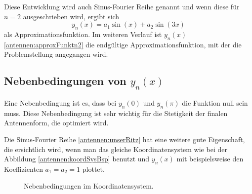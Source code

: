 Diese Entwicklung wird auch Sinus-Fourier Reihe genannt
und wenn diese für $n=2$ ausgeschrieben wird, ergibt sich
\begin{equation}
	y_n(x)
	=
	a_1\sin(x)+a_2\sin(3x)
	\label{antennen:approxFunktn2}
\end{equation}
als Approximationsfunktion. Im weiteren Verlauf ist $y_n(x)$ \eqref{antennen:approxFunktn2} 
die endgültige Approximationsfunktion, mit der die Problemstellung angegangen wird.

\subsection{Nebenbedingungen von $y_n(x)$\label{antennen:nebenbedRitz}}

Eine Nebenbedingung ist es, dass bei $y_n(0)$ und $y_n(\pi)$ die Funktion null sein muss.
Diese Nebenbedingung ist sehr wichtig für die Stetigkeit der finalen Antennenform, die optimiert wird.

Die Sinus-Fourier Reihe \eqref{antennen:unserRitz} hat eine weitere gute Eigenschaft, 
die ersichtlich wird, wenn man das gleiche Koordinatensystem wie bei der Abbildung \ref{antennen:koordSysBsp}
benutzt und $y_n(x)$ mit beispielsweise den Koeffizienten $a_1=a_2=1$ plottet.

\begin{figure}
	\centering
	\caption{Nebenbedingungen im Koordinatensystem.}
	\label{antennen:nebenbedGrafik}
\end{figure}

